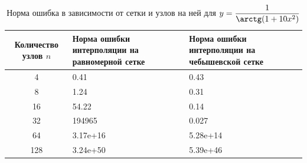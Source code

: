 \documentclass{article}
\begin{document}
    \begin{table}[H]
        \centering
        \caption{Норма ошибка в зависимости от сетки и узлов на ней для $y = \dfrac{1}{\arctg (1+10x^2)}$}
        \begin{tabular}{|c|p{5cm}|p{5cm}|}
            \hline
            Количество узлов $n$ & Норма ошибки интерполяции
            на равномерной сетке & Норма ошибки интерполяции
            на чебышевской сетке \\
            \hline 
            4 & 0.41 &  0.43 \\ \hline
            8 &  1.24 & 0.31\\ \hline
            16 &54.22 & 0.14\\ \hline
            32 & 194965 & 0.027\\ \hline
            64 &3.17e+16 &  5.28e+14\\ \hline
            128 &  3.24e+50&  5.39e+46\\ \hline
        \end{tabular}
    \end{table}
\end{document}
